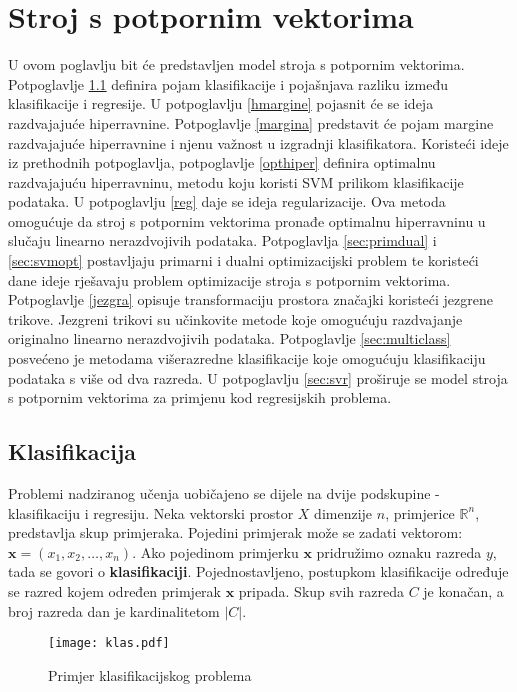 \documentclass[times, utf8, zavrsni, numeric]{fer}
\begin{document}
\chapter{Stroj s potpornim vektorima} \label{svm}
U ovom poglavlju bit će predstavljen model stroja s potpornim vektorima. 
Potpoglavlje \ref{klasifikacija} definira pojam klasifikacije i pojašnjava razliku između klasifikacije i regresije.
U potpoglavlju \ref{hmargine} pojasnit će se ideja razdvajajuće hiperravnine.
Potpoglavlje \ref{margina} predstavit će pojam margine razdvajajuće hiperravnine i njenu važnost u izgradnji
klasifikatora.
Koristeći ideje iz prethodnih potpoglavlja, potpoglavlje \ref{opthiper} definira optimalnu razdvajajuću hiperravninu,
metodu koju koristi SVM prilikom klasifikacije podataka.
U potpoglavlju \ref{reg} daje se ideja regularizacije. Ova metoda omogućuje da stroj s potpornim vektorima
pronađe optimalnu hiperravninu u slučaju linearno nerazdvojivih podataka.
Potpoglavlja \ref{sec:primdual} i \ref{sec:svmopt} postavljaju primarni i dualni optimizacijski problem 
te koristeći dane ideje rješavaju problem optimizacije stroja s potpornim vektorima.
Potpoglavlje \ref{jezgra} opisuje transformaciju prostora značajki koristeći jezgrene trikove.
Jezgreni trikovi su učinkovite metode koje omogućuju razdvajanje originalno linearno nerazdvojivih podataka.
Potpoglavlje \ref{sec:multiclass} posvećeno je metodama višerazredne klasifikacije koje omogućuju
klasifikaciju podataka s više od dva razreda.
U potpoglavlju \ref{sec:svr} proširuje se model stroja s potpornim vektorima za primjenu kod regresijskih
problema.


\section{Klasifikacija} \label{klasifikacija}
Problemi nadziranog učenja uobičajeno se dijele na dvije podskupine - klasifikaciju i regresiju.
Neka vektorski prostor $\textit{X}$ dimenzije $n$, primjerice $\mathbb{R}^n$, predstavlja skup primjeraka. 
Pojedini primjerak može se zadati vektorom: $\mathbf{x}=(x_1,x_2,\dots,x_n)$.
Ako pojedinom primjerku $\mathbf{x}$ pridružimo oznaku razreda $y$, tada se govori o \textbf{klasifikaciji}.
Pojednostavljeno, postupkom klasifikacije određuje se razred kojem određen primjerak $\mathbf{x}$ pripada.
Skup svih razreda $\textit{C}$ je konačan, a broj razreda dan je kardinalitetom $\left\vert{C}\right\vert$.

\begin{figure}
\centering
\texttt{[image: klas.pdf]}
\caption{Primjer klasifikacijskog problema}
\label{fig:klas}
\end{figure}
\end{document}
